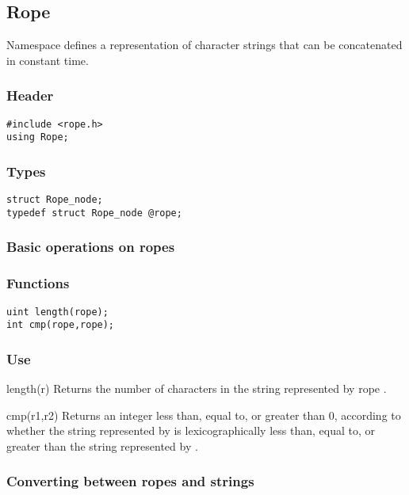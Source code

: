 \subsection{Rope}

Namespace  defines a representation of character strings that
can be concatenated in constant time.

\subsubsection*{Header}
\begin{verbatim}
#include <rope.h>
using Rope;
\end{verbatim}

\subsubsection*{Types}
\begin{verbatim}
struct Rope_node;
typedef struct Rope_node @rope;
\end{verbatim}


\subsubsection*{Basic operations on ropes}
\subsubsection*{Functions}
\begin{verbatim}
uint length(rope);
int cmp(rope,rope);
\end{verbatim}

\subsubsection*{Use}

\begin{defun}{length}{(r)}
Returns the number of characters in the string represented by rope
.
\end{defun}

\begin{defun}{cmp}{(r1,r2)}
Returns an integer less than, equal to, or greater than 0, according to
whether the string represented by  is lexicographically less
than, equal to, or greater than the string represented by .
\end{defun}

\subsubsection*{Converting between ropes and strings}
